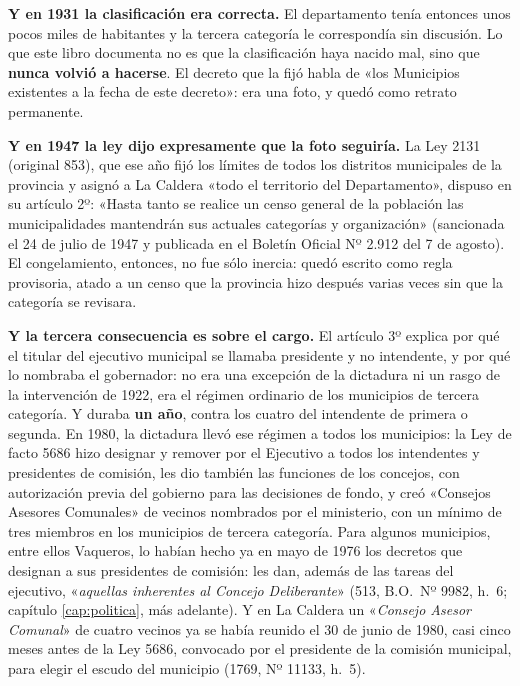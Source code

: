 \textbf{Y en 1931 la clasificación era correcta.} El departamento tenía entonces unos pocos
miles de habitantes y la tercera categoría le correspondía sin discusión. Lo que este libro
documenta no es que la clasificación haya nacido mal, sino que \textbf{nunca volvió a
hacerse}. El decreto que la fijó habla de «los Municipios existentes a la fecha de este
decreto»: era una foto, y quedó como retrato permanente.

\textbf{Y en 1947 la ley dijo expresamente que la foto seguiría.} La Ley 2131 (original 853), que ese año fijó los límites de todos los distritos municipales de la provincia y asignó a La Caldera «todo el territorio del Departamento», dispuso en su artículo 2º: «Hasta tanto se realice un censo general de la población las municipalidades mantendrán sus actuales categorías y organización» (sancionada el 24 de julio de 1947 y publicada en el Boletín Oficial Nº 2.912 del 7 de agosto). El congelamiento, entonces, no fue sólo inercia: quedó escrito como regla provisoria, atado a un censo que la provincia hizo después varias veces sin que la categoría se revisara.

\textbf{Y la tercera consecuencia es sobre el cargo.} El artículo 3º explica por qué el
titular del ejecutivo municipal se llamaba presidente y no intendente, y por qué lo nombraba
el gobernador: no era una excepción de la dictadura ni un rasgo de la intervención de 1922,
era el régimen ordinario de los municipios de tercera categoría. Y duraba \textbf{un año},
contra los cuatro del intendente de primera o segunda. En 1980, la dictadura llevó ese régimen a todos los municipios: la Ley de facto 5686 hizo designar y remover por el Ejecutivo a todos los intendentes y presidentes de comisión, les dio también las funciones de los concejos, con autorización previa del gobierno para las decisiones de fondo, y creó «Consejos Asesores Comunales» de vecinos nombrados por el ministerio, con un mínimo de tres miembros en los municipios de tercera categoría. Para algunos municipios, entre ellos Vaqueros, lo habían hecho ya en mayo de 1976 los decretos que designan a sus presidentes de comisión: les dan, además de las tareas del ejecutivo, «\textit{aquellas inherentes al Concejo Deliberante}» (513, B.O.\ Nº 9982, h.\ 6; capítulo \ref{cap:politica}, más adelante). Y en La Caldera un «\textit{Consejo Asesor Comunal}» de cuatro vecinos ya se había reunido el 30 de junio de 1980, casi cinco meses antes de la Ley 5686, convocado por el presidente de la comisión municipal, para elegir el escudo del municipio (1769, Nº 11133, h.\ 5).

